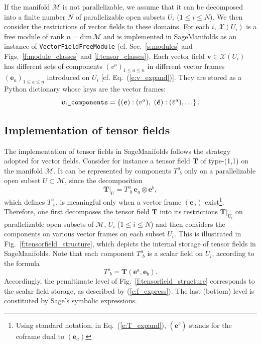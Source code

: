 \documentclass[a4paper]{jpconf}
\newcommand{\soft}[1]{\textsf{#1}}
\newcommand{\code}[1]{\texttt{#1}}
\newcommand{\Sage}{\soft{Sage}}
\newcommand{\SM}{\soft{SageManifolds}}
\newcommand{\be}{\begin{equation}}
\newcommand{\ee}{\end{equation}}
\newcommand{\w}[1]{\bm{#1}}
\begin{document}
If the manifold $\mathcal{M}$ is not parallelizable,
we assume that it can be decomposed into a finite number $N$
of parallelizable open subsets $U_i$ ($1\leq i \leq N$).
We then consider the restrictions of vector fields to these domains.
For each $i$, $\mathscr{X}(U_i)$ is a free module of rank $n=\mathrm{dim}\, \mathcal{M}$ and is implemented in \SM{} as an instance of 
\code{VectorFieldFreeModule} (cf. Sec.~\ref{s:modules} and Figs.~\ref{f:module_classes}
and \ref{f:tensor_classes}). 
Each vector field $\w{v}\in  \mathscr{X}(U_i)$ has different sets
of components $(v^a)_{1\leq a\leq n}$ in different vector frames 
$(\w{e}_a)_{1\leq a \leq n}$ introduced on $U_i$ [cf. Eq.~(\ref{e:v_expand})]. They are stored
as a Python dictionary whose keys are the vector frames:
\be
\w{v}.\mbox{\texttt{\_components}} = \left\{ (\w{e}): (v^a),
\ (\w{\hat e}): ({\hat v}^a), \ldots \right\}. 
\ee


\subsection{Implementation of tensor fields}

The implementation of tensor fields in \SM{} follows the strategy 
adopted for vector fields. Consider for instance a tensor field $\w{T}$ 
of type-(1,1) on the manifold $\mathcal{M}$. 
It can be represented by 
components $T^a_{\ \, b}$ only on a parallelizable open subset $U\subset
\mathcal{M}$, since the decomposition 
\be \label{e:T_expand}
    \left. \w{T} \right| _{U} = T^a_{\ \, b} \, \w{e}_a \otimes \w{e}^b ,
\ee
which defines $T^a_{\ \, b}$, is meaningful only when a vector frame 
$(\w{e}_a)$ exist\footnote{Using standard notation, in Eq.~(\ref{e:T_expand}),
$(\w{e}^b)$ stands for the coframe dual to $(\w{e}_a)$}.
Therefore, one first decomposes the tensor field $\w{T}$  into 
its restrictions $\left. \w{T} \right| _{U_i}$ on parallelizable open subsets
of $\mathcal{M}$, $U_i$ ($1\leq i\leq N$) and then considers 
the components on various vector frames on each subset $U_i$. 
This is illustrated in Fig.~\ref{f:tensorfield_structure}, which depicts the
internal storage of tensor fields in \SM{}. Note that each component
$T^a_{\ \, b}$ is a scalar field on $U_i$, according to the formula
\be
    T^a_{\ \, b} = \w{T}(\w{e}^a, \w{e}_b) . 
\ee
Accordingly, the penultimate level of Fig.~\ref{f:tensorfield_structure} 
corresponds to the scalar field storage, as described by (\ref{e:f_express}).
The last (bottom) level is constituted by \Sage{}'s symbolic expressions. 
\end{document}
